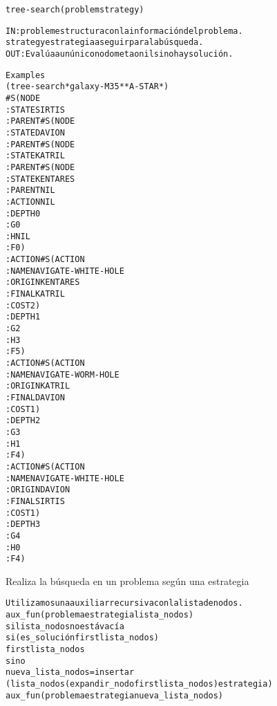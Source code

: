 \begin{aibox}{\function}
\begin{alltt}
tree-search (problem strategy)

   IN: problem     estructura con la información del problema.
       strategy     estrategia a seguir para la búsqueda.
   OUT: Evalúa a un único nodo meta o nil si no hay solución.

\end{alltt}
\end{aibox}

\begin{aibox}{\examples}
\begin{alltt}
Examples
(tree-search *galaxy-M35* *A-STAR*)
\#S(NODE
   :STATE SIRTIS
   :PARENT \#S(NODE
              :STATE DAVION
              :PARENT \#S(NODE
                         :STATE KATRIL
                         :PARENT \#S(NODE
                                    :STATE KENTARES
                                    :PARENT NIL
                                    :ACTION NIL
                                    :DEPTH 0
                                    :G 0
                                    :H NIL
                                    :F 0)
                         :ACTION \#S(ACTION
                                    :NAME NAVIGATE-WHITE-HOLE
                                    :ORIGIN KENTARES
                                    :FINAL KATRIL
                                    :COST 2)
                         :DEPTH 1
                         :G 2
                         :H 3
                         :F 5)
              :ACTION \#S(ACTION
                         :NAME NAVIGATE-WORM-HOLE
                         :ORIGIN KATRIL
                         :FINAL DAVION
                         :COST 1)
              :DEPTH 2
              :G 3
              :H 1
              :F 4)
   :ACTION \#S(ACTION
              :NAME NAVIGATE-WHITE-HOLE
              :ORIGIN DAVION
              :FINAL SIRTIS
              :COST 1)
   :DEPTH 3
   :G 4
   :H 0
   :F 4)


\end{alltt}
\end{aibox}

\begin{aibox}{\comments}
Realiza la búsqueda en un problema según una estrategia

\end{aibox}

\begin{aibox}{\pseudocode}
\begin{alltt}
   Utilizamos una auxiliar recursiva con la lista de nodos.
   aux\_fun(problema estrategia lista\_nodos)
       si lista\_nodos no está vacía
           si ( es\_solución first lista\_nodos)
               first lista\_nodos
           sino
               nueva\_lista\_nodos = insertar
                         (lista\_nodos (expandir\_nodo first lista\_nodos) estrategia)
               aux\_fun (problema estrategia nueva\_lista\_nodos)
   

\end{alltt}
\end{aibox}

